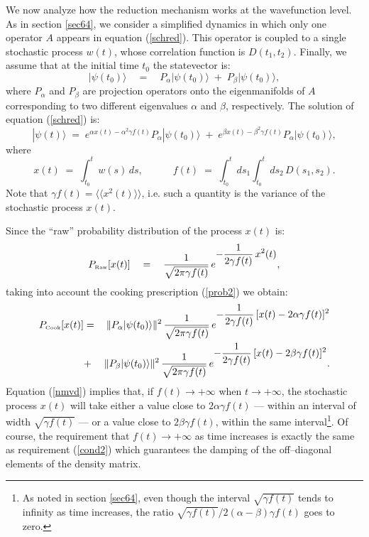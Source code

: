 \documentclass[10pt,a4paper]{article}
\newcommand{\llangle}{\langle\!\langle}
\newcommand{\rrangle}{\rangle\!\rangle}
\begin{document}
We now analyze how the reduction mechanism works at the
wavefunction level. As in section \ref{sec64}, we consider a
simplified dynamics in which only one operator $A$ appears in
equation (\ref{schred}). This operator is coupled to a single
stochastic process $w(t)$, whose correlation function is $D(t_{1},
t_{2})$. Finally, we assume that at the initial time $t_{0}$ the
statevector is:
\begin{equation}
|\psi(t_{0})\rangle \quad = \quad P_{\alpha} |\psi(t_{0})\rangle
\; + \; P_{\beta} |\psi(t_{0})\rangle,
\end{equation}
where $P_{\alpha}$ and $P_{\beta}$ are projection operators onto
the eigenmanifolds of $A$ corresponding to two different
eigenvalues $\alpha$ and $\beta$, respectively. The solution of
equation (\ref{schred}) is:
\begin{equation}
|\psi(t)\rangle \; = \; e^{\displaystyle \alpha x(t) - \alpha^{2}
\gamma f(t)}P_{\alpha} |\psi(t_{0})\rangle \; + \;
e^{\displaystyle \beta x(t) - \beta^{2} \gamma f(t)}P_{\alpha}
|\psi(t_{0})\rangle,
\end{equation}
where
\begin{equation}
x(t) \; = \; \int_{t_{0}}^{t} w(s)\, ds, \qquad\quad f(t) \; = \;
\int_{t_{0}}^{t} ds_{1} \int_{t_{0}}^{t} ds_{2}\, D(s_{1}, s_{2}).
\end{equation}
Note that $\gamma f(t) = \llangle x^{2}(t) \rrangle$, i.e. such a
quantity is the variance of the stochastic process $x(t)$.

Since the ``raw'' probability distribution of the process $x(t)$
is:
\begin{equation}
P_{\makebox{\tiny Raw}}[x(t)] \quad  = \quad \frac{1}{\sqrt{2\pi
\gamma f(t)}}\, e^{\displaystyle -\frac{1}{2\gamma f(t)}\,
x^{2}(t)},
\end{equation}
taking into account the cooking prescription (\ref{prob2}) we
obtain:
\begin{eqnarray} \label{nmvd}
P_{\makebox{\tiny Cook}}[x(t)] &  = & \|P_{\alpha}
|\psi(t_{0})\rangle \|^{2}\, \frac{1}{\sqrt{2\pi\gamma f(t)}}\,
e^{\displaystyle -\frac{1}{2\gamma f(t)}\, [x(t) - 2\alpha\gamma
f(t)]^{2}} \nonumber \\
&  + & \|P_{\beta} |\psi(t_{0})\rangle \|^{2}\,
\frac{1}{\sqrt{2\pi\gamma f(t)}}\, e^{\displaystyle
-\frac{1}{2\gamma
f(t)}\, [x(t) - 2\beta\gamma f(t)]^{2}}. \nonumber \\
\end{eqnarray}
Equation (\ref{nmvd}) implies that, if $f(t) \rightarrow +\infty$
when $t \rightarrow +\infty$, the stochastic process $x(t)$ will
take either a value close to $2\alpha\gamma f(t)$ --- within an
interval of width $\sqrt{\gamma f(t)}$ --- or a value close to
$2\beta\gamma f(t)$, within the same interval\footnote{As noted in
section \ref{sec64}, even though the interval $\sqrt{\gamma f(t)}$
tends to infinity as time increases, the ratio $\sqrt{\gamma
f(t)}/ 2(\alpha - \beta)\gamma f(t)$ goes to zero.}. Of course,
the requirement that $f(t) \rightarrow +\infty$ as time increases
is exactly the same as requirement (\ref{cond2}) which guarantees
the damping of the off--diagonal elements of the density matrix.
\end{document}
